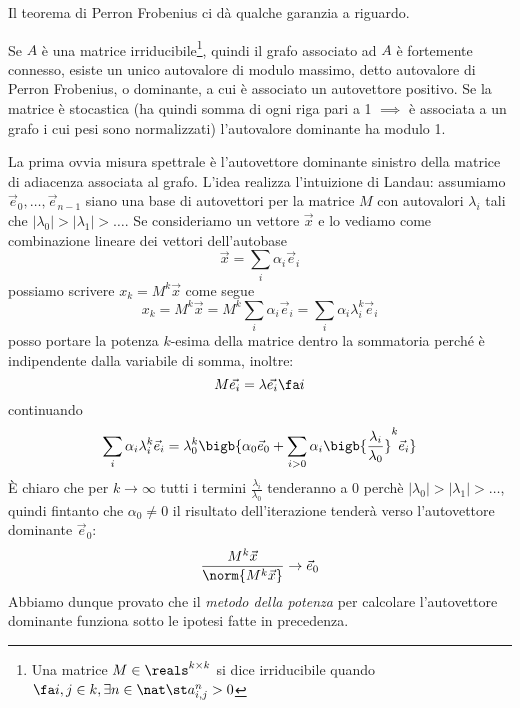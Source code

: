 Il teorema di Perron Frobenius ci dà qualche garanzia a riguardo.
\begin{theorem}
	Se $A$ è una matrice irriducibile\footnote{Una matrice $M \in \reals^{k \times k}$ si dice irriducibile quando $\fa i, j \in k, \exists n \in \nat \st a_{i, j}^n > 0$}, quindi il grafo associato ad $A$ è fortemente connesso, esiste un unico autovalore di modulo massimo, detto autovalore di Perron Frobenius, o dominante, a cui è associato un autovettore positivo. Se la matrice è stocastica (ha quindi somma di ogni riga pari a 1 $\implies$ è associata a un grafo i cui pesi sono normalizzati) l'autovalore dominante ha modulo 1.
\end{theorem}
\noindent La prima ovvia misura spettrale è l'autovettore dominante sinistro della matrice di adiacenza associata al grafo. L'idea realizza l'intuizione di Landau: assumiamo $\vec{e}_0, \dots, \vec{e}_{n - 1}$ siano una base di autovettori per la matrice $M$ con autovalori $\lambda_i$ tali che $|\lambda_0| > |\lambda_1| > \dots$. Se consideriamo un vettore $\vec{x}$ e lo vediamo come combinazione lineare dei vettori dell'autobase
\begin{equation}
	\vec{x} = \sum_i{\alpha_i\vec{e}_i}
\end{equation}
possiamo scrivere $x_k = M^k\vec{x}$ come segue
\begin{equation}
	x_k = M^k\vec{x} = M^k\sum_i{\alpha_i\vec{e}_i} = \sum_i{\alpha_i \lambda_i^k \vec{e}_i}
\end{equation}
posso portare la potenza $k$-esima della matrice dentro la sommatoria perché è indipendente dalla variabile di somma, inoltre:
\begin{equation}
	M\vec{e_i} = \lambda \vec{e_i} \fa i
\end{equation}
continuando
\begin{equation}
	\sum_i{\alpha_i \lambda_i^k \vec{e}_i} = \lambda_0^k\bigb{\alpha_0\vec{e}_0 + \sum_{i > 0}{\alpha_i\bigb{\frac{\lambda_i}{\lambda_0}}^k\vec{e}_i}}
\end{equation}
È chiaro che per $k \to \infty$ tutti i termini $\frac{\lambda_i}{\lambda_0}$ tenderanno a 0 perchè $|\lambda_0| > |\lambda_1| > \dots$, quindi fintanto che $\alpha_0 \neq 0$ il risultato dell'iterazione tenderà verso l'autovettore dominante $\vec{e}_0$:
\begin{equation}
	\frac{M^k\vec{x}}{\norm{M^k\vec{x}}} \to \vec{e}_0
\end{equation}
Abbiamo dunque provato che il \textit{metodo della potenza} per calcolare l'autovettore dominante funziona sotto le ipotesi fatte in precedenza.

